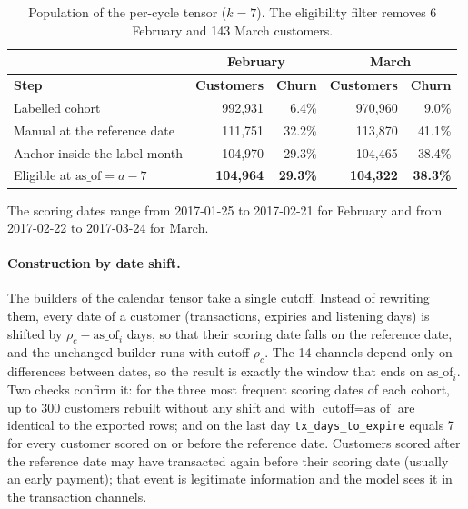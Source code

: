 \documentclass{article}
\begin{document}
\begin{table}[H]
\centering
\renewcommand{\arraystretch}{1.3}
\begin{tabular}{|l|r|r|r|r|}
\hline
 & \multicolumn{2}{c|}{\textbf{February}} & \multicolumn{2}{c|}{\textbf{March}} \\ \hline
\textbf{Step} & \textbf{Customers} & \textbf{Churn} & \textbf{Customers} & \textbf{Churn} \\ \hline
Labelled cohort                  & 992{,}931 & 6.4\%  & 970{,}960 & 9.0\% \\ \hline
Manual at the reference date     & 111{,}751 & 32.2\% & 113{,}870 & 41.1\% \\ \hline
Anchor inside the label month    & 104{,}970 & 29.3\% & 104{,}465 & 38.4\% \\ \hline
Eligible at $\text{as\_of} = a - 7$ & \textbf{104{,}964} & \textbf{29.3\%} & \textbf{104{,}322} & \textbf{38.3\%} \\ \hline
\end{tabular}
\caption{Population of the per-cycle tensor ($k = 7$). The eligibility filter removes 6 February and 143 March customers.}
\label{tab:w2_cycle_pop}
\end{table}

The scoring dates range from 2017-01-25 to 2017-02-21 for February and from 2017-02-22 to 2017-03-24 for March.

\paragraph{Construction by date shift.} The builders of the calendar tensor take a single cutoff. Instead of rewriting them, every date of a customer (transactions, expiries and listening days) is shifted by $\rho_c - \text{as\_of}_i$ days, so that their scoring date falls on the reference date, and the unchanged builder runs with cutoff $\rho_c$. The 14 channels depend only on differences between dates, so the result is exactly the window that ends on $\text{as\_of}_i$. Two checks confirm it: for the three most frequent scoring dates of each cohort, up to 300 customers rebuilt without any shift and with $\text{cutoff} = \text{as\_of}$ are identical to the exported rows; and on the last day \texttt{tx\_days\_to\_expire} equals 7 for every customer scored on or before the reference date. Customers scored after the reference date may have transacted again before their scoring date (usually an early payment); that event is legitimate information and the model sees it in the transaction channels.
\end{document}
